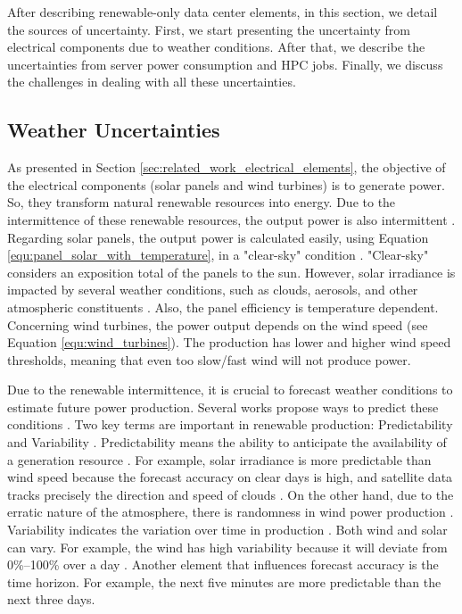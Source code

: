 After describing renewable-only data center elements, in this section, we detail the sources of uncertainty. First, we start presenting the uncertainty from electrical components due to weather conditions. After that, we describe the uncertainties from server power consumption and HPC jobs. Finally, we discuss the challenges in dealing with all these uncertainties.

\subsection{Weather Uncertainties}
As presented in Section \ref{sec:related_work_electrical_elements}, the objective of the electrical components (solar panels and wind turbines) is to generate power. So, they transform natural renewable resources into energy. Due to the intermittence of these renewable resources, the output power is also intermittent \cite{perez2011managing}. Regarding solar panels, the output power is calculated easily, using Equation \ref{equ:panel_solar_with_temperature}, in a "clear-sky" condition \cite{tuohy2015solar}. "Clear-sky" considers an exposition total of the panels to the sun. However, solar irradiance is impacted by several weather conditions, such as clouds, aerosols, and other atmospheric constituents \cite{tuohy2015solar}. Also, the panel efficiency is temperature dependent. Concerning wind turbines, the power output depends on the wind speed (see Equation \ref{equ:wind_turbines}). The production has lower and higher wind speed thresholds, meaning that even too slow/fast wind will not produce power. 

Due to the renewable intermittence, it is crucial to forecast weather conditions to estimate future power production. Several works propose ways to predict these conditions \cite{tuohy2015solar, soman2010review, sharma2018review, ssekulima2016wind}. Two key terms are important in renewable production: Predictability and Variability \cite{ssekulima2016wind, perez2011managing}. Predictability means the ability to anticipate the availability of a generation resource \cite{perez2011managing}. For example, solar irradiance is more predictable than wind speed because the forecast accuracy on clear days is high, and satellite data tracks precisely the direction and speed of clouds \cite{perez2011managing}. On the other hand, due to the erratic nature of the atmosphere, there is randomness in wind power production \cite{sharma2018review}. Variability indicates the variation over time in production \cite{perez2011managing}. Both wind and solar can vary. For example, the wind has high variability because it will deviate from 0\%–100\% over a day \cite{perez2011managing}. Another element that influences forecast accuracy is the time horizon. For example, the next five minutes are more predictable than the next three days.

